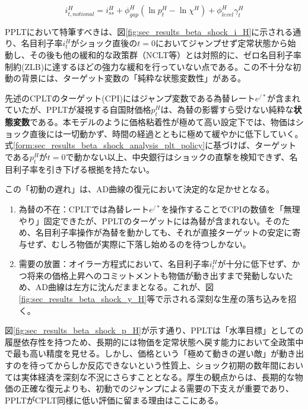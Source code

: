 \begin{equation}
i_{t,notional}^H=i_{ss}^H+\phi_{gap}^H(\ln p_t^H-\ln\chi^H)+\phi_{level}^H\gamma_t^H
\label{form:sec_results_beta_shock_analysis_plt_policy}
\end{equation}

PPLTにおいて特筆すべきは、図\ref{fig:sec_results_beta_shock_i_H}に示される通り、名目利子率\(i_t^H\)がショック直後の\(t=0\)においてジャンプせず定常状態から始動し、その後も他の緩和的な政策群（NCLT等）とは対照的に、ゼロ名目利子率制約(ZLB)に達するほどの強力な緩和を行っていない点である。この不十分な初動の背景には、ターゲット変数の「純粋な状態変数性」がある。

先述のCPLTのターゲット(CPI)にはジャンプ変数である為替レート\(e^{/*}\)が含まれていたが、PPLTが凝視する自国財価格\(p_t^H\)は、為替の影響すら受けない純粋な\textbf{状態変数}である。本モデルのように価格粘着性が極めて高い設定下では、物価はショック直後には一切動かず、時間の経過とともに極めて緩やかに低下していく。式\eqref{form:sec_results_beta_shock_analysis_plt_policy}に基づけば、ターゲットである\(p_t^H\)が\(t=0\)で動かない以上、中央銀行はショックの直撃を検知できず、名目利子率を引き下げる根拠を持たない。

この「初動の遅れ」は、AD曲線の復元において決定的な足かせとなる。

\begin{enumerate}
    \item\label{itm:sec_results_beta_shock_analysis_pplt_forex} 為替の不在：CPLTでは為替レート\(e^{/*}\)を操作することでCPIの数値を「無理やり」固定できたが、PPLTのターゲットには為替が含まれない。そのため、名目利子率操作が為替を動かしても、それが直接ターゲットの安定に寄与せず、むしろ物価が実際に下落し始めるのを待つしかない。
    \item\label{itm:sec_results_beta_shock_analysis_pplt_demand} 需要の放置：オイラー方程式において、名目利子率\(i_t^H\)が十分に低下せず、かつ将来の価格上昇へのコミットメントも物価が動き出すまで発動しないため、AD曲線は左方に沈んだままとなる。これが、図\ref{fig:sec_results_beta_shock_y_H}等で示される深刻な生産の落ち込みを招く。
\end{enumerate}

図\ref{fig:sec_results_beta_shock_p_H}が示す通り、PPLTは「水準目標」としての履歴依存性を持つため、長期的には物価を定常状態へ戻す能力において全政策中で最も高い精度を見せる。しかし、価格という「極めて動きの遅い敵」が動き出すのを待ってからしか反応できないという性質上、ショック初期の数年間においては実体経済を深刻な不況にさらすこととなる。厚生の観点からは、長期的な物価の正確な復元よりも、初動でのジャンプによる需要の下支えが重要であり、PPLTがCPLT同様に低い評価に留まる理由はここにある。

